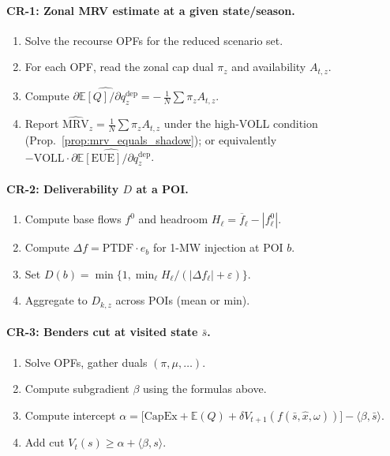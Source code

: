 \documentclass[11pt]{article}
\newcommand{\E}{\mathbb{E}}
\numberwithin{equation}{section}
\theoremstyle{definition}
\theoremstyle{remark}
\begin{document}
\paragraph{CR-1: Zonal MRV estimate at a given state/season.}
\begin{enumerate}[leftmargin=1.2em,itemsep=0.25em]
  \item Solve the recourse OPFs for the reduced scenario set.
  \item For each OPF, read the zonal cap dual $\pi_{z}$ and availability $A_{t,z}$.
  \item Compute $\widehat{\partial \E[Q] / \partial q^{\mathrm{dep}}_{z}} = -\,\frac{1}{N}\sum \pi_{z}A_{t,z}$.
  \item Report $\widehat{\mathrm{MRV}}_z = \frac{1}{N}\sum \pi_{z}A_{t,z}$ under the high-VOLL condition (Prop.~\ref{prop:mrv_equals_shadow}); or equivalently $-\mathrm{VOLL}\cdot \widehat{\partial \E[\mathrm{EUE}] / \partial q^{\mathrm{dep}}_{z}}$.
\end{enumerate}

\paragraph{CR-2: Deliverability $D$ at a POI.}
\begin{enumerate}[leftmargin=1.2em,itemsep=0.25em]
  \item Compute base flows $f^0$ and headroom $H_\ell=\overline f_\ell-|f^0_\ell|$.
  \item Compute $\Delta f=\mathrm{PTDF}\cdot e_b$ for 1-MW injection at POI $b$.
  \item Set $D(b)=\min\{1,\min_\ell H_\ell/(|\Delta f_\ell|+\varepsilon)\}$.
  \item Aggregate to $D_{k,z}$ across POIs (mean or min).
\end{enumerate}

\paragraph{CR-3: Benders cut at visited state $\bar s$.}
\begin{enumerate}[leftmargin=1.2em,itemsep=0.25em]
  \item Solve OPFs, gather duals $(\pi,\mu,\dots)$.
  \item Compute subgradient $\beta$ using the formulas above.
  \item Compute intercept $\alpha = \big[\mathrm{CapEx}+ \E(Q) + \delta V_{t+1}(f(\bar s,\hat x,\omega))\big] - \langle \beta, \bar s\rangle$.
  \item Add cut $V_t(s)\ge \alpha + \langle \beta,s\rangle$.
\end{enumerate}
\end{document}
